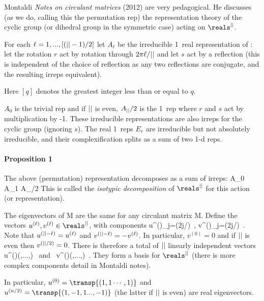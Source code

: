 \begin{description}
Montaldi  {{\em
Notes on circulant matrices}} (2012) are very pedagogical. He discusses (as
we do, calling this the permutation rep) the representation theory of
the cyclic group (or dihedral group in the symmetric case) acting on
$\reals^\cl{}$.

For each $\ell =1,...,[({||}-1)/2]$ let
$A_{\ell}$ be the irreducible 1\dmn\ real representation of \Dn{\cl{}}: let
the rotation $r$ act by rotation through $2\pi\ell/{||}$ and let $s$ act by
a reflection (this is independent of the choice of reflection as any two
reflections are conjugate, and the resulting irreps equivalent).

Here $[q]$ denotes the greatest integer less than or equal to $q$.

$A_{0}$ is the trivial rep and if ${||}$ is even, $A_{||}/2$ is the 1\dmn\
rep where $r$ and $s$ act by multiplication by -1. These irreducible
representations are also irreps for the cyclic group \Cn{\cl{}} (ignoring
$s$).
The real 1\dmn\ reps $E_r$ are irreducible but not absolutely irreducible,
and their complexification splits as a sum of two 1-d reps.

\paragraph{Proposition 1}
The above (permutation)  representation decomposes as a sum of irreps:
\beq
A_0 \oplus A_1 \cdots \oplus A_{\cl{}/2}
This is called the \emph{isotypic decomposition} of $\reals^\cl{}$ for this
action (or representation).

The eigenvectors of M are the same for any circulant matrix  M.
Define the vectors $u^{(\ell)},v^{(\ell)} \in \reals^\cl{}$, with components
\beq
u^{(\ell)}_j=\cos(2{\pi}j\ell/\cl{})
    \,,\qquad
v^{(\ell)}_j=\sin(2{\pi}j\ell/\cl{})
\,.
Note that
$u^{({||}-\ell)} = u^{(\ell)}$ and
$v^{({||}-\ell)} =-v^{(\ell)}$.
In particular, $v^{(0)}=0$ and if ${||}$ is even then $v^{({||}/2)}=0$.
There is therefore a total of ${||}$  linearly independent vectors
\beq
u^{(\ell)}\;\;(,...,)
\mbox{ and }
v^{(\ell)}\;\;(,...,)
\,.
They form a basis for $\reals^\cl{}$
(there is more complex components detail in Montaldi notes).

In particular,
$u^{(0)}= \transp{(1,1\cdots,1)}$ and
$u^{(n/2)}=\transp{(1,-1,1...,-1)}$
(the latter if ${||}$ is even) are real eigenvectors.


\end{description}
